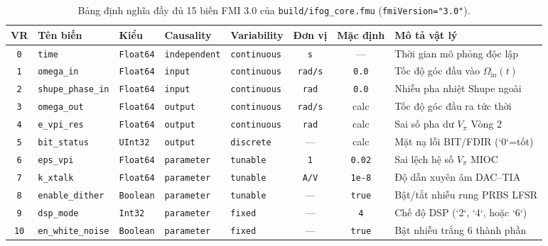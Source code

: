 \documentclass[11pt, a4paper]{article}
\begin{document}
\begin{table}[htbp]
\centering
\caption{Bảng định nghĩa đầy đủ 15 biến FMI 3.0 của \texttt{build/ifog\_core.fmu} (\texttt{fmiVersion="3.0"}).}
\label{tab:fmi3_vars}
\footnotesize
\renewcommand{\arraystretch}{1.15}
\begin{tabular}{@{}c L{2.5cm} L{1.4cm} L{1.9cm} L{1.7cm} c c L{4.0cm}@{}}
\toprule
\textbf{VR} & \textbf{Tên biến} & \textbf{Kiểu} & \textbf{Causality} & \textbf{Variability} & \textbf{Đơn vị} & \textbf{Mặc định} & \textbf{Mô tả vật lý} \\
\midrule
\texttt{0} & \texttt{time} & \texttt{Float64} & \texttt{independent} & \texttt{continuous} & \texttt{s} & --- & Thời gian mô phỏng độc lập \\
\texttt{1} & \texttt{omega\_in} & \texttt{Float64} & \texttt{input} & \texttt{continuous} & \texttt{rad/s} & \texttt{0.0} & Tốc độ góc đầu vào $\Omega_{\text{in}}(t)$ \\
\texttt{2} & \texttt{shupe\_phase\_in} & \texttt{Float64} & \texttt{input} & \texttt{continuous} & \texttt{rad} & \texttt{0.0} & Nhiễu pha nhiệt Shupe ngoài \\
\texttt{3} & \texttt{omega\_out} & \texttt{Float64} & \texttt{output} & \texttt{continuous} & \texttt{rad/s} & calc & Tốc độ góc đầu ra tức thời \\
\texttt{4} & \texttt{e\_vpi\_res} & \texttt{Float64} & \texttt{output} & \texttt{continuous} & \texttt{rad} & calc & Sai số pha dư $V_\pi$ Vòng 2 \\
\texttt{5} & \texttt{bit\_status} & \texttt{UInt32} & \texttt{output} & \texttt{discrete} & --- & calc & Mặt nạ lỗi BIT/FDIR (`0`=tốt) \\
\texttt{6} & \texttt{eps\_vpi} & \texttt{Float64} & \texttt{parameter} & \texttt{tunable} & \texttt{1} & \texttt{0.02} & Sai lệch hệ số $V_\pi$ MIOC \\
\texttt{7} & \texttt{k\_xtalk} & \texttt{Float64} & \texttt{parameter} & \texttt{tunable} & \texttt{A/V} & \texttt{1e-8} & Độ dẫn xuyên âm DAC--TIA \\
\texttt{8} & \texttt{enable\_dither} & \texttt{Boolean} & \texttt{parameter} & \texttt{tunable} & --- & \texttt{true} & Bật/tắt nhiễu rung PRBS LFSR \\
\texttt{9} & \texttt{dsp\_mode} & \texttt{Int32} & \texttt{parameter} & \texttt{fixed} & --- & \texttt{4} & Chế độ DSP (`2`, `4`, hoặc `6`) \\
\texttt{10} & \texttt{en\_white\_noise} & \texttt{Boolean} & \texttt{parameter} & \texttt{fixed} & --- & \texttt{true} & Bật nhiễu trắng 6 thành phần \\

\end{tabular}
\end{table}
\end{document}
